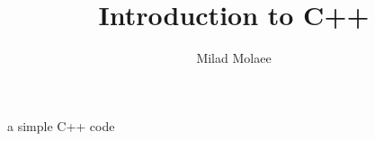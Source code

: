 \documentclass{beamer}
\author[miladmolaee@hotmail.com]{ Milad Molaee}
\title[Introduction to C++]{Introduction to C++}
\begin{document}
 
%
\frame{\titlepage}

%

\begin{frame}{a simple C++ code}

\end{frame}
%
\end{document}
